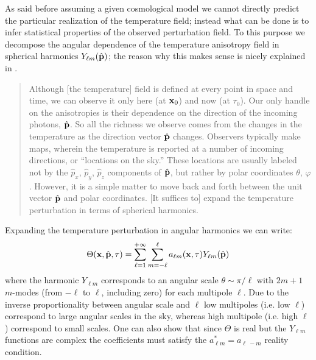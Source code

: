 As said before assuming a given cosmological model we cannot directly predict the particular realization of the temperature field; instead what can be done is to infer statistical properties of the observed perturbation field. To this purpose we decompose the angular dependence of the temperature anisotropy field in spherical harmonics $Y_{\ell m}(\hat{\vb{p}})$; the reason why this makes sense is nicely explained in \cite{modern_cosmology}.
\begin{quote}
    Although [the temperature] field is defined at every point in space and time, we can observe it only here (at $\vb{x}_0$) and now (at $\tau_0$). Our only handle on the anisotropies is their dependence on the direction of the incoming photons, $\hat{\vb{p}}$. So all the richness we observe comes from the changes in the temperature as the direction vector $\hat{\vb{p}}$ changes. Observers typically make maps, wherein the temperature is reported at a number of incoming directions, or ``locations on the sky.'' These locations are usually labeled not by the $\hat{p}_x$, $\hat{p}_y$, $\hat{p}_z$ components of $\hat{\vb{p}}$, but rather by polar coordinates $\theta$, $\varphi$. However, it is a simple matter to move back and forth between the unit vector $\hat{\vb{p}}$ and polar coordinates. [It suffices to] expand the temperature perturbation in terms of spherical harmonics.
\end{quote}
Expanding the temperature perturbation in angular harmonics we can write:
\begin{equation*}
    \Theta(\vb{x}, \hat{\vb{p}}, \tau) = \sum_{\ell=1}^{+\infty} \sum_{m=-\ell}^\ell a_{\ell m}(\vb{x}, \tau) Y_{\ell m}(\hat{\vb{p}})
\end{equation*}
where the harmonic $Y_{\ell m}$ corresponds to an angular scale $\theta \sim \pi/\ell$ with $2m+1$ $m$-modes (from $-\ell$ to $\ell$, including zero) for each multipole $\ell$. Due to the inverse proportionality between angular scale and $\ell$ low multipoles (i.e. low $\ell$) correspond to large angular scales in the sky, whereas high multipole (i.e. high $\ell$) correspond to small scales. One can also show that since $\Theta$ is real but the $Y_{\ell m}$ functions are complex the coefficients must satisfy the $a_{\ell m}^* = a_{\ell \ -m}$ reality condition.

